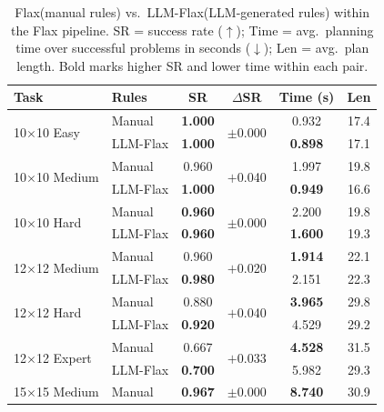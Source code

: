 \documentclass{ieeeaccess}
\newcommand{\method}{LLM-Flax\xspace}
\newcommand{\baseline}{Flax\xspace}
\begin{document}
\begin{table}[t]
    \centering
    \caption{\baseline (manual rules) vs.\ \method (LLM-generated rules) within the Flax pipeline. SR = success rate ($\uparrow$); Time = avg.\ planning time over successful problems in seconds ($\downarrow$); Len = avg.\ plan length. Bold marks higher SR and lower time within each pair.}
    \label{tab:main}
    \small
    \setlength{\tabcolsep}{3.5pt}
    \renewcommand{\arraystretch}{1.05}
    \begin{tabular}{llcccc}
        \toprule
        \textbf{Task} & \textbf{Rules} & \textbf{SR} & \textbf{$\Delta$SR} & \textbf{Time (s)} & \textbf{Len} \\
        \midrule
        \multirow{2}{*}{10$\times$10 Easy}
            & Manual  & \textbf{1.000} & \multirow{2}{*}{$\pm$0.000} & 0.932 & 17.4 \\
            & \method & \textbf{1.000} &  & \textbf{0.898} & 17.1 \\
        \midrule
        \multirow{2}{*}{10$\times$10 Medium}
            & Manual  & 0.960 & \multirow{2}{*}{$+$0.040} & 1.997 & 19.8 \\
            & \method & \textbf{1.000} &  & \textbf{0.949} & 16.6 \\
        \midrule
        \multirow{2}{*}{10$\times$10 Hard}
            & Manual  & \textbf{0.960} & \multirow{2}{*}{$\pm$0.000} & 2.200 & 19.8 \\
            & \method & \textbf{0.960} &  & \textbf{1.600} & 19.3 \\
        \midrule
        \multirow{2}{*}{12$\times$12 Medium}
            & Manual  & 0.960 & \multirow{2}{*}{$+$0.020} & \textbf{1.914} & 22.1 \\
            & \method & \textbf{0.980} &  & 2.151 & 22.3 \\
        \midrule
        \multirow{2}{*}{12$\times$12 Hard}
            & Manual  & 0.880 & \multirow{2}{*}{$+$0.040} & \textbf{3.965} & 29.8 \\
            & \method & \textbf{0.920} &  & 4.529 & 29.2 \\
        \midrule
        \multirow{2}{*}{12$\times$12 Expert}
            & Manual  & 0.667 & \multirow{2}{*}{$+$0.033} & \textbf{4.528} & 31.5 \\
            & \method & \textbf{0.700} &  & 5.982 & 29.3 \\
        \midrule
        \multirow{2}{*}{15$\times$15 Medium}
            & Manual  & \textbf{0.967} & \multirow{2}{*}{$\pm$0.000} & \textbf{8.740} & 30.9 \\

\end{tabular}
\end{table}
\end{document}
